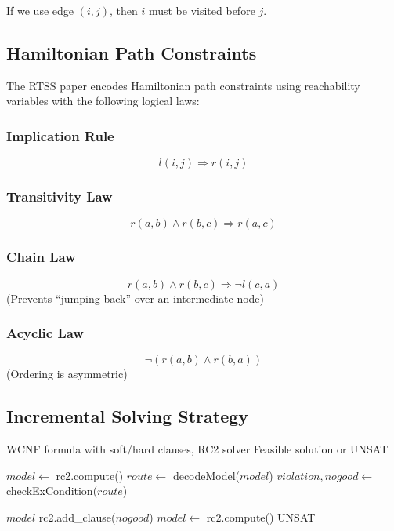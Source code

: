 \documentclass[12pt,a4paper]{article}
\theoremstyle{definition}
\begin{document}
If we use edge $(i,j)$, then $i$ must be visited before $j$.

\subsection{Hamiltonian Path Constraints}

The RTSS paper encodes Hamiltonian path constraints using reachability variables with the following logical laws:

\subsubsection{Implication Rule}
\begin{equation}
l(i,j) \Rightarrow r(i,j)
\end{equation}

\subsubsection{Transitivity Law}
\begin{equation}
r(a,b) \wedge r(b,c) \Rightarrow r(a,c)
\end{equation}

\subsubsection{Chain Law}
\begin{equation}
r(a,b) \wedge r(b,c) \Rightarrow \neg l(c,a)
\end{equation}
(Prevents ``jumping back'' over an intermediate node)

\subsubsection{Acyclic Law}
\begin{equation}
\neg(r(a,b) \wedge r(b,a))
\end{equation}
(Ordering is asymmetric)

\subsection{Incremental Solving Strategy}

\begin{algorithm}[H]
\caption{RTSS Incremental Solving (solveRTSS)}
\begin{algorithmic}[1]
\Require WCNF formula with soft/hard clauses, RC2 solver
\Ensure Feasible solution or UNSAT

\State $model \gets$ rc2.compute()
    \State $route \gets$ decodeModel($model$)
    \State $violation, nogood \gets$ checkExCondition($route$)
    
        \State \Return $model$ 
    \Else
        \State rc2.add\_clause($nogood$) 
        \State $model \gets$ rc2.compute()
    \EndIf
\EndWhile
\State \Return UNSAT
\end{algorithmic}
\end{algorithm}
\end{document}
